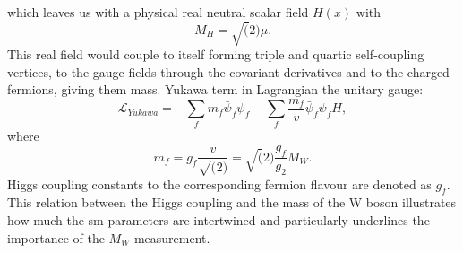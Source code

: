   which leaves us with a physical real neutral scalar field $H(x)$ with 
    \begin{equation}
	M_H=\sqrt(2)\mu.
  \end{equation}
 This real field would couple to itself forming triple and quartic self-coupling vertices, to the gauge fields through the covariant derivatives and to the charged fermions, giving them mass. Yukawa term in Lagrangian the unitary gauge:
     \begin{equation}
\mathcal{L}_{Yukawa}=-\sum_f m_f \bar\psi_f\psi_f-\sum_f \frac{m_f}{v} \bar\psi_f\psi_f H,
 \end{equation}
where
\begin{equation}
m_f=g_f\frac{v}{\sqrt(2)}=\sqrt(2)\frac{g_f}{g_2}M_W.
\end{equation}
Higgs coupling constants to the corresponding fermion flavour are denoted as $g_f$. This relation between the Higgs coupling and the mass of the W boson illustrates how much the \gls{sm} parameters are intertwined and particularly underlines the importance of the $M_W$ measurement.
